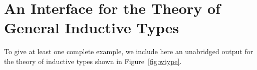 \section{An Interface for the Theory of General Inductive Types}
\label{sec:outp-induct-types}

To give at least one complete example, we include here an
unabridged output for the theory of inductive types shown in
Figure~\ref{fig:wtype}.


